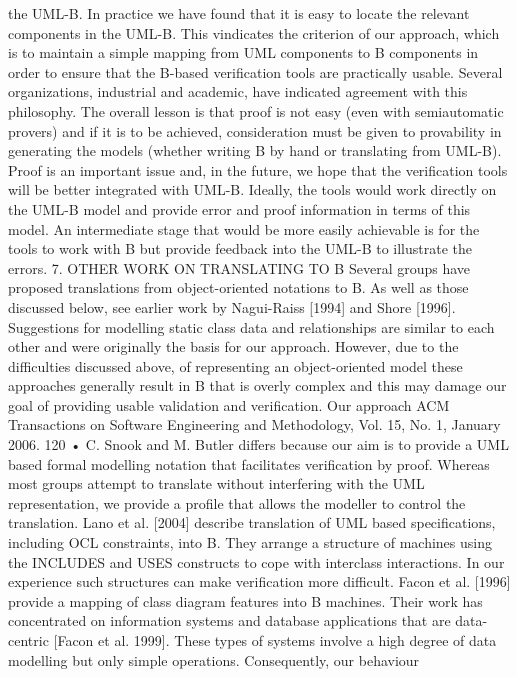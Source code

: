 the UML-B. In practice we have found that it is easy to locate the relevant
components in the UML-B. This vindicates the criterion of our approach, which
is to maintain a simple mapping from UML components to B components in
order to ensure that the B-based verification tools are practically usable. Several organizations, industrial and academic, have indicated agreement with
this philosophy. The overall lesson is that proof is not easy (even with semiautomatic provers) and if it is to be achieved, consideration must be given to
provability in generating the models (whether writing B by hand or translating
from UML-B). Proof is an important issue and, in the future, we hope that the
verification tools will be better integrated with UML-B. Ideally, the tools would
work directly on the UML-B model and provide error and proof information in
terms of this model. An intermediate stage that would be more easily achievable is for the tools to work with B but provide feedback into the UML-B to
illustrate the errors.
7. OTHER WORK ON TRANSLATING TO B
Several groups have proposed translations from object-oriented notations to B.
As well as those discussed below, see earlier work by Nagui-Raiss [1994] and
Shore [1996]. Suggestions for modelling static class data and relationships are
similar to each other and were originally the basis for our approach. However,
due to the difficulties discussed above, of representing an object-oriented model
these approaches generally result in B that is overly complex and this may
damage our goal of providing usable validation and verification. Our approach
ACM Transactions on Software Engineering and Methodology, Vol. 15, No. 1, January 2006.
120 • C. Snook and M. Butler
differs because our aim is to provide a UML based formal modelling notation
that facilitates verification by proof. Whereas most groups attempt to translate
without interfering with the UML representation, we provide a profile that
allows the modeller to control the translation.
Lano et al. [2004] describe translation of UML based specifications, including OCL constraints, into B. They arrange a structure of machines using the
INCLUDES and USES constructs to cope with interclass interactions. In our
experience such structures can make verification more difficult. Facon et al.
[1996] provide a mapping of class diagram features into B machines. Their
work has concentrated on information systems and database applications that
are data-centric [Facon et al. 1999]. These types of systems involve a high degree of data modelling but only simple operations. Consequently, our behaviour
